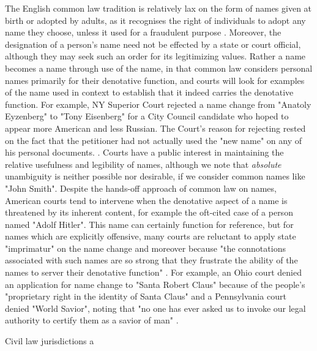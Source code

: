 The English common law tradition is relatively lax on the form of names given at birth or adopted by adults, as it recognises the right of individuals to adopt any name they choose, unless it used for a fraudulent purpose \parencite[403]{heymann11}. Moreover, the designation of a person's name need not be effected by a state or court official, although they may seek such an order for its legitimizing values. Rather a name becomes a name through use of the name, in that common law considers personal names primarily for their denotative function, and courts will look for examples of the name used in context to establish that it indeed carries the denotative function. For example, NY Superior Court rejected a name change from "Anatoly Eyzenberg" to "Tony Eisenberg" for a City Council candidate who hoped to appear more American and less Russian. The Court's reason for rejecting rested on the fact that the petitioner had not actually used the "new name" on any of his personal documents. \parencite{eisenberg03} \parencite[404]{heymann11}. Courts have a public interest in maintaining the relative usefulness and legibility of names, although we note that \textit{absolute} unambiguity is neither possible nor desirable, if we consider common names like "John Smith". Despite the hands-off approach of common law on names, American courts tend to intervene when the denotative aspect of a name is threatened by its inherent content, for example the oft-cited case of a person named "Adolf Hitler". This name can certainly function for reference, but for names which are explicitly offensive, many courts are reluctant to apply state "imprimatur" on the name change \parencite[413]{heymann11} and moreover because "the connotations associated with such names are so strong that they frustrate the ability of the names to server their denotative function" \parencite[417]{heymann11}. For example, an Ohio court denied an application for name change to "Santa Robert Claus" because of the people's "proprietary right in the identity of Santa Claus" \parencite[419]{heymann11} \parencite{handley00} and a Pennsylvania court denied "World Savior", noting that "no one has ever asked us to invoke our legal authority to certify them as a savior of man" \parencite[419]{heymann11} \parencite{bethea91}.

Civil law jurisdictions a

